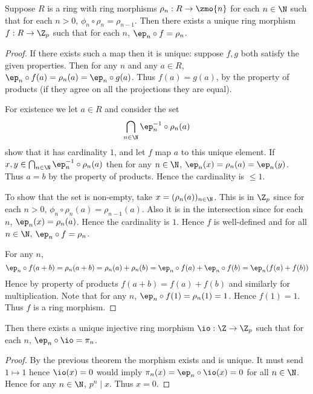 \begin{prop}
    Suppose $R$ is a ring with ring morphisms 
    $\rho_n : R \to \zmo{n}$ for each $n \in \N$
    such that for each $n > 0$, 
    $\phi_n \circ \rho_n = \rho_{n-1}$.
    Then there exists a unique ring morphism $f : R \to \Z_p$
    such that for each $n$, 
    $\ep_n \circ f = \rho_n$.
\end{prop}
\begin{proof}
    If there exists such a map then it is unique:
    suppose $f,g$ both satisfy the given properties.
    Then for any $n$ and any $a \in R$,
    $\ep_n \circ f (a)= \rho_n (a) = \ep_n \circ g (a)$.
    Thus $f(a) = g(a)$, by the property of products
    (if they agree on all the projections they are equal).

    For existence we let $a \in R$ and consider the set
    \[\bigcap_{n \in \N} {\ep_n^{-1} \circ \rho_n (a)}\]
    show that it has cardinality $1$,
    and let $f$ map $a$ to this unique element.
    If $x,y \in \bigcap_{n \in \N} {\ep_n^{-1} \circ \rho_n (a)}$
    then for any $n \in \N$, 
    $\ep_n (x) = \rho_n (a) = \ep_n (y)$.
    Thus $a = b$ by the property of products.
    Hence the cardinality is $\le 1$.

    To show that the set is non-empty,
    take $x = (\rho_n (a))_{n \in \N}$.
    This is in $\Z_p$ since for each $n>0$,
    $\phi_n \circ \rho_n(a) = \rho_{n - 1}(a)$.
    Also it is in the intersection since for each $n$,
    $\ep_n(x) = \rho_n(a)$. 
    Hence the cardinality is $1$.
    Hence $f$ is well-defined and for all $n \in \N$, 
    $\ep_n \circ f = \rho_n$.

    For any $n$, 
    \[\ep_n \circ f (a + b) = \rho_n (a + b) = \rho_n (a) + \rho_n (b)
    = \ep_n \circ f(a) + \ep_n \circ f(b) = \ep_n (f(a) + f(b))\]
    Hence by property of products $f(a + b) = f(a) + f(b)$
    and similarly for multiplication.
    Note that for any $n$, 
    $\ep_n \circ f(1) = \rho_n (1) = 1$.
    Hence $f(1) = 1$.
    Thus $f$ is a ring morphism.
\end{proof}

\begin{cor}
    Then there exists a unique injective ring morphism 
    $\io : \Z \to \Z_p$
    such that for each $n$, 
    $\ep_n \circ \io = \pi_n$.
\end{cor}
\begin{proof}
    By the previous theorem the morphism exists and is unique.
    It must send $1 \mapsto 1$ hence $\io(x) = 0$ would imply
    $\pi_n (x) = \ep_n \circ \io(x) = 0$ for all $n \in \N$.
    Hence for any $n \in \N$, 
    $p^n \mid x$.
    Thus $x = 0$.
\end{proof}

